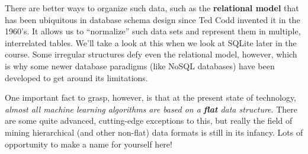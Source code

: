 There are better ways to organize such data, such as the \textbf{relational
model} that has been ubiquitous in database schema design since Ted Codd
invented it in the 1960's. It allows us to ``normalize'' such data sets and
represent them in multiple, interrelated tables. We'll take a look at this
when we look at SQLite later in the course. Some irregular structures defy
even the relational model, however, which is why some newer database paradigms
(like NoSQL databases) have been developed to get around its limitations.

One important fact to grasp, however, is that at the present state of
technology, \textit{almost all machine learning algorithms are based on a
\textbf{flat} data structure}. There are some quite advanced, cutting-edge
exceptions to this, but really the field of mining hierarchical (and other
non-flat) data formats is still in its infancy. Lots of opportunity to make a
name for yourself here!
